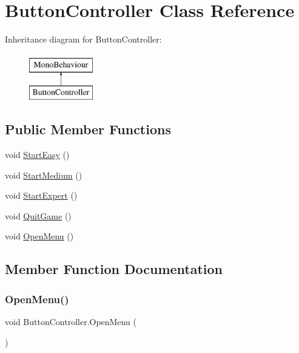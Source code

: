 \hypertarget{classButtonController}{}\section{Button\+Controller Class Reference}
\label{classButtonController}
Inheritance diagram for Button\+Controller\+:\begin{figure}[H]
\begin{center}
\leavevmode
\includegraphics[height=2.000000cm]{classButtonController}
\end{center}
\end{figure}
\subsection*{Public Member Functions}
\begin{DoxyCompactItemize}
\item 
void \hyperlink{classButtonController_ab67d398509e02d51726507d69f2634a0}{Start\+Easy} ()
\item 
void \hyperlink{classButtonController_a198408f350c340ce92f80b7852e7d4e5}{Start\+Medium} ()
\item 
void \hyperlink{classButtonController_ab12902a74cfa351febb2b2075135aa0e}{Start\+Expert} ()
\item 
void \hyperlink{classButtonController_a43b8b5937d9c842e17346074ad8d783d}{Quit\+Game} ()
\item 
void \hyperlink{classButtonController_a4ff55d0048e94800f93558e0aef54159}{Open\+Menu} ()
\end{DoxyCompactItemize}


\subsection{Member Function Documentation}
\mbox{\label{classButtonController_a4ff55d0048e94800f93558e0aef54159}} 
\subsubsection{\texorpdfstring{Open\+Menu()}{OpenMenu()}}
{\footnotesize\ttfamily void Button\+Controller.\+Open\+Menu (\begin{DoxyParamCaption}{ }\end{DoxyParamCaption})\hspace{0.3cm}{\ttfamily [inline]}}

